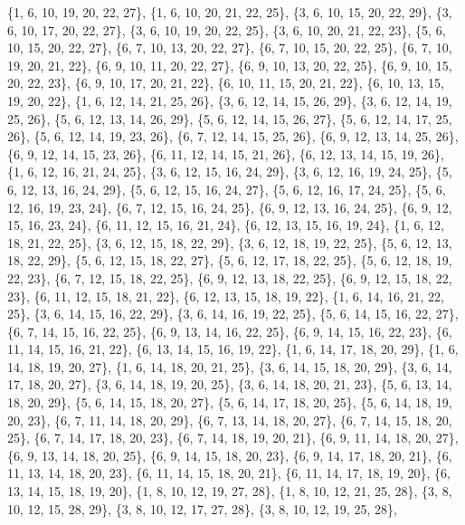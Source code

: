 \documentclass[11pt,a4paper]{article}
\begin{document}
{\{1, 6, 10, 19, 20, 22, 27\}, \{1, 6, 10, 20, 21, 22, 25\}, \{3, 6, 10, 15, 20, 22, 29\}, \{3, 6, 10, 17, 20, 22, 27\}, \{3, 6, 10, 19, 20, 22, 25\},
\{3, 6, 10, 20, 21, 22, 23\}, \{5, 6, 10, 15, 20, 22, 27\}, \{6, 7, 10, 13, 20, 22, 27\}, \{6, 7, 10, 15, 20, 22, 25\}, \{6, 7, 10, 19, 20, 21, 22\},
\{6, 9, 10, 11, 20, 22, 27\}, \{6, 9, 10, 13, 20, 22, 25\}, \{6, 9, 10, 15, 20, 22, 23\}, \{6, 9, 10, 17, 20, 21, 22\}, \{6, 10, 11, 15, 20, 21, 22\},
\{6, 10, 13, 15, 19, 20, 22\}, \{1, 6, 12, 14, 21, 25, 26\}, \{3, 6, 12, 14, 15, 26, 29\}, \{3, 6, 12, 14, 19, 25, 26\}, \{5, 6, 12, 13, 14, 26, 29\},
\{5, 6, 12, 14, 15, 26, 27\}, \{5, 6, 12, 14, 17, 25, 26\}, \{5, 6, 12, 14, 19, 23, 26\}, \{6, 7, 12, 14, 15, 25, 26\}, \{6, 9, 12, 13, 14, 25, 26\},
\{6, 9, 12, 14, 15, 23, 26\}, \{6, 11, 12, 14, 15, 21, 26\}, \{6, 12, 13, 14, 15, 19, 26\}, \{1, 6, 12, 16, 21, 24, 25\}, \{3, 6, 12, 15, 16, 24, 29\},
\{3, 6, 12, 16, 19, 24, 25\}, \{5, 6, 12, 13, 16, 24, 29\}, \{5, 6, 12, 15, 16, 24, 27\}, \{5, 6, 12, 16, 17, 24, 25\}, \{5, 6, 12, 16, 19, 23, 24\},
\{6, 7, 12, 15, 16, 24, 25\}, \{6, 9, 12, 13, 16, 24, 25\}, \{6, 9, 12, 15, 16, 23, 24\}, \{6, 11, 12, 15, 16, 21, 24\}, \{6, 12, 13, 15, 16, 19, 24\},
\{1, 6, 12, 18, 21, 22, 25\}, \{3, 6, 12, 15, 18, 22, 29\}, \{3, 6, 12, 18, 19, 22, 25\}, \{5, 6, 12, 13, 18, 22, 29\}, \{5, 6, 12, 15, 18, 22, 27\},
\{5, 6, 12, 17, 18, 22, 25\}, \{5, 6, 12, 18, 19, 22, 23\}, \{6, 7, 12, 15, 18, 22, 25\}, \{6, 9, 12, 13, 18, 22, 25\}, \{6, 9, 12, 15, 18, 22, 23\},
\{6, 11, 12, 15, 18, 21, 22\}, \{6, 12, 13, 15, 18, 19, 22\}, \{1, 6, 14, 16, 21, 22, 25\}, \{3, 6, 14, 15, 16, 22, 29\}, \{3, 6, 14, 16, 19, 22, 25\},
\{5, 6, 14, 15, 16, 22, 27\}, \{6, 7, 14, 15, 16, 22, 25\}, \{6, 9, 13, 14, 16, 22, 25\}, \{6, 9, 14, 15, 16, 22, 23\}, \{6, 11, 14, 15, 16, 21, 22\},
\{6, 13, 14, 15, 16, 19, 22\}, \{1, 6, 14, 17, 18, 20, 29\}, \{1, 6, 14, 18, 19, 20, 27\}, \{1, 6, 14, 18, 20, 21, 25\}, \{3, 6, 14, 15, 18, 20, 29\},
\{3, 6, 14, 17, 18, 20, 27\}, \{3, 6, 14, 18, 19, 20, 25\}, \{3, 6, 14, 18, 20, 21, 23\}, \{5, 6, 13, 14, 18, 20, 29\}, \{5, 6, 14, 15, 18, 20, 27\},
\{5, 6, 14, 17, 18, 20, 25\}, \{5, 6, 14, 18, 19, 20, 23\}, \{6, 7, 11, 14, 18, 20, 29\}, \{6, 7, 13, 14, 18, 20, 27\}, \{6, 7, 14, 15, 18, 20, 25\},
\{6, 7, 14, 17, 18, 20, 23\}, \{6, 7, 14, 18, 19, 20, 21\}, \{6, 9, 11, 14, 18, 20, 27\}, \{6, 9, 13, 14, 18, 20, 25\}, \{6, 9, 14, 15, 18, 20, 23\},
\{6, 9, 14, 17, 18, 20, 21\}, \{6, 11, 13, 14, 18, 20, 23\}, \{6, 11, 14, 15, 18, 20, 21\}, \{6, 11, 14, 17, 18, 19, 20\}, \{6, 13, 14, 15, 18, 19, 20\},
\{1, 8, 10, 12, 19, 27, 28\}, \{1, 8, 10, 12, 21, 25, 28\}, \{3, 8, 10, 12, 15, 28, 29\}, \{3, 8, 10, 12, 17, 27, 28\}, \{3, 8, 10, 12, 19, 25, 28\},
}
\end{document}
